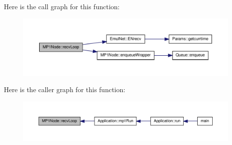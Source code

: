 \-Here is the call graph for this function\-:
\nopagebreak
\begin{figure}[H]
\begin{center}
\leavevmode
\includegraphics[width=350pt]{db/d4b/class_m_p1_node_a61c78c68e9033a5ff52c3fc2e1a3982b_cgraph}
\end{center}
\end{figure}




\-Here is the caller graph for this function\-:
\nopagebreak
\begin{figure}[H]
\begin{center}
\leavevmode
\includegraphics[width=350pt]{db/d4b/class_m_p1_node_a61c78c68e9033a5ff52c3fc2e1a3982b_icgraph}
\end{center}
\end{figure}




